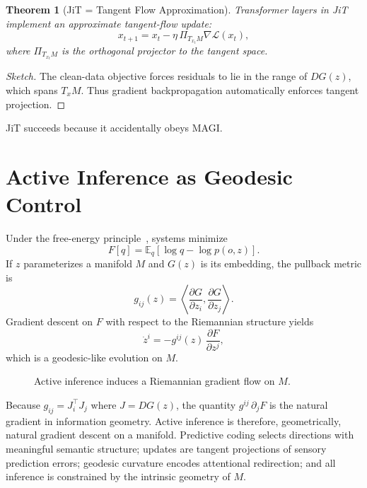 \documentclass[11pt,a4paper,twocolumn]{article}
\newtheorem{theorem}{Theorem}[section]
\begin{document}
\begin{theorem}[JiT = Tangent Flow Approximation]
Transformer layers in JiT implement an approximate tangent-flow update:
\[
x_{t+1} = x_t - \eta\,\Pi_{T_{x_t} M} \nabla \mathcal{L}(x_t),
\]
where $\Pi_{T_{x_t} M}$ is the orthogonal projector to the tangent space.
\end{theorem}

\begin{proof}[Sketch]
The clean-data objective forces residuals to lie in the range of
$DG(z)$, which spans $T_x M$. Thus gradient backpropagation
automatically enforces tangent projection.
\end{proof}

JiT succeeds because it accidentally obeys MAGI.


\section{Active Inference as Geodesic Control}

Under the free-energy principle~\cite{friston2010freeenergy}, systems
minimize
\[
F[q] = \mathbb{E}_q[\log q - \log p(o,z)].
\]
If $z$ parameterizes a manifold $M$ and $G(z)$ is its embedding, the
pullback metric is
\[
g_{ij}(z) = \left\langle
\frac{\partial G}{\partial z_i},
\frac{\partial G}{\partial z_j}
\right\rangle.
\]
Gradient descent on $F$ with respect to the Riemannian structure yields
\[
\dot{z}^i = - g^{ij}(z)\, \frac{\partial F}{\partial z^j},
\]
which is a geodesic-like evolution on $M$.

\begin{figure}[H]
\centering
{}
\caption{Active inference induces a Riemannian gradient flow on $M$.}
\end{figure}

Because $g_{ij} = J_i^\top J_j$ where $J = DG(z)$, the quantity
$g^{ij}\,\partial_j F$ is the natural gradient in information geometry.
Active inference is therefore, geometrically, natural gradient descent
on a manifold. Predictive coding selects directions with meaningful
semantic structure; updates are tangent projections of sensory
prediction errors; geodesic curvature encodes attentional redirection;
and all inference is constrained by the intrinsic geometry of $M$.
\end{document}
